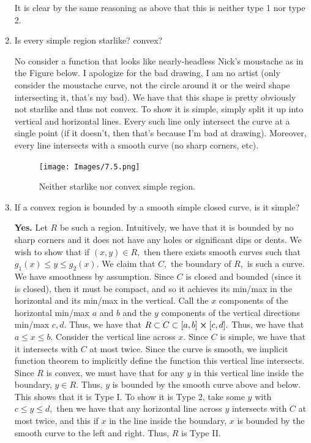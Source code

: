 \documentclass[11pt]{article}
\begin{document}
\begin{enumerate}
\begin{solution}
It is clear by the same reasoning as above that this is neither type 1 nor type 2.
\end{solution}
\item 
\begin{problem}
    Is every simple region starlike? convex?
\end{problem}
\begin{solution}
    No consider a function that looks like nearly-headless Nick's moustache as in the Figure below. I apologize for the bad drawing, I am no artist (only consider the moustache curve, not the circle around it or the weird shape intersecting it, that's my bad). We have that this shape is pretty obviously not starlike and thus not convex. To show it is simple, simply split it up into vertical and horizontal lines. Every such line only intersect the curve at a single point (if it doesn't, then that's because I'm bad at drawing). Moreover, every line intersects with a smooth curve (no sharp corners, etc). 
\end{solution}
\begin{figure}[h!]
    \centering
    \texttt{[image: Images/7.5.png]}
    \caption{Neither starlike nor convex simple region.}
\end{figure}
\item 
\begin{problem}
    If a convex region is bounded by a smooth simple closed curve, is it simple?
\end{problem}
\begin{solution}
    \textbf{Yes.} Let $R$ be such a region. Intuitively, we have that it is bounded by no sharp corners and it does not have any holes or significant dips or dents. We wish to show that if $(x,y)\in R,$ then there exists smooth curves such that $g_1(x)\leq y \leq g_2(x).$ We claim that $C,$ the boundary of $R,$ is such a curve. We have smoothness by assumption. Since $C$ is closed and bounded (since it is closed), then it must be compact, and so it achieves its min/max in the horizontal and its min/max in the vertical. Call the $x$ components of the horizontal min/max $a$ and $b$ and the $y$ components of the vertical directions min/max $c,d.$ Thus, we have that $ R \subset C \subset [a,b]\cross [c,d].$ Thus, we have that $a\leq x \leq b.$ Consider the vertical line across $x.$ Since $C$ is simple, we have that it intersects with $C$ at most twice. Since the curve is smooth, we implicit function theorem to implicitly define the function this vertical line intersects. Since $R$ is convex, we must have that for any $y$ in this vertical line inside the boundary, $y \in R.$ Thus, $y$ is bounded by the smooth curve above and below. This shows that it is Type I. To show it is Type 2, take some $y$ with $c \leq y \leq d,$ then we have that any horizontal line across $y$ intersects with $C$ at most twice, and this if $x$ in the line inside the boundary, $x$ is bounded by the smooth curve to the left and right. Thus, $R$ is Type II.

\end{solution}
\end{enumerate}
\end{document}
